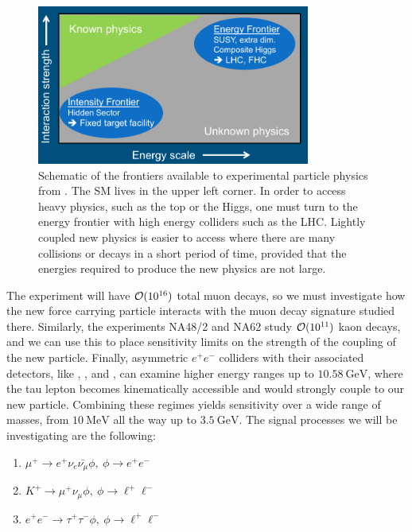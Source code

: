 \begin{figure}[h]
    \centering
    \includegraphics[width = 0.8\textwidth]{Figures/misc/frontiers}
    \caption[Schematic of the frontiers available to experimental particle physics.]{Schematic of the frontiers available to experimental particle physics from \cite{Alekhin:2015byh}. The SM lives in the upper left corner. In order to access heavy physics, such as the top or the Higgs, one must turn to the energy frontier with high energy colliders such as the LHC. Lightly coupled new physics is easier to access where there are many collisions or decays in a short period of time, provided that the energies required to produce the new physics are not large.}
    \label{fig:frontiers}
\end{figure}

The experiment \mueee will have $\operatorname{\mathcal{O}}(10^{16})$ total muon decays, so we must investigate how the new force carrying particle interacts with the muon decay signature studied there.
Similarly, the experiments NA48/2 and NA62 study $\operatorname{\mathcal{O}}(10^{11})$ kaon decays, and we can use this to place sensitivity limits on the strength of the coupling of the new particle.
Finally, asymmetric $e^+ e^-$ colliders with their associated detectors, like \babar, \belle, and \belletwo, can examine higher energy ranges up to $10.58~\textrm{GeV}$, where the tau lepton becomes kinematically accessible and would strongly couple to our new particle.
Combining these regimes yields sensitivity over a wide range of masses, from $10~\textrm{MeV}$ all the way up to $3.5~\textrm{GeV}$.
The signal processes we will be investigating are the following:

\begin{enumerate}
\item $\mu^+ \rightarrow e^+ \nu_e \bar{\nu_\mu} \phi,~\phi \rightarrow e^+ e^-$
\item $K^+ \rightarrow \mu^+ \nu_\mu \phi,~\phi \rightarrow \ell^+ \ell^-$
\item $e^+ e^- \rightarrow \tau^+ \tau^- \phi,~\phi \rightarrow \ell^+ \ell^-$
\end{enumerate}

